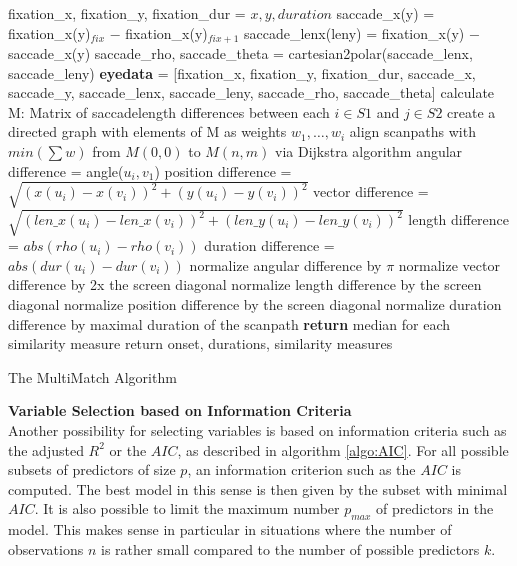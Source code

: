 \documentclass[a4paper, 11pt]{scrreprt}
\begin{document}
\begin{algorithm}
	
	{ 
		{
		fixation\_x, fixation\_y, fixation\_dur = $x, y, duration$ \;
		saccade\_x(y) = fixation\_x(y)$_{fix}$ $-$ fixation\_x(y)$_{fix+1}$ \;
		saccade\_lenx(leny) = fixation\_x(y) $-$ saccade\_x(y)\;
		saccade\_rho, saccade\_theta = cartesian2polar(saccade\_lenx, saccade\_leny) \;
		\textbf{eyedata} = [fixation\_x, fixation\_y, fixation\_dur, saccade\_x, saccade\_y, \newline saccade\_lenx, saccade\_leny, saccade\_rho, saccade\_theta]
			}
	{
		calculate M: Matrix of saccadelength differences between each $i \in S1$ and  $j \in S2$\;
		create a directed graph with elements of M as weights $w_1, \ldots, w_i$\;
		align scanpaths with $min(\sum w)$ from $M(0,0)$ to $M(n,m)$ via Dijkstra algorithm\;
	}
	{
	angular difference = angle($u_i, v_1$)\;
	position difference = $\sqrt{(x(u_i) - x(v_i))^2 + (y(u_i) - y(v_i))^2}$ \;
	vector difference = $\sqrt{(len\_x(u_i) - len\_x(v_i))^2 + (len\_y(u_i) - len\_y(v_i))^2}$\;
	length difference = $abs(rho(u_i) - rho(v_i))$\;
	duration difference = $abs(dur(u_i)-dur(v_i))$ \;
	}
	normalize angular difference by $\pi$\;
	normalize vector difference by 2x the screen diagonal\;
	normalize length difference by the screen diagonal\;
	normalize position difference by the screen diagonal\;
	normalize duration difference by maximal duration of the scanpath\;
	\textbf{return} median for each similarity measure
	}
	return onset, durations, similarity measures
	\caption{The MultiMatch Algorithm}
	\label{algo:multimatch}
\end{algorithm}



\bigskip 
\textbf{Variable Selection based on Information Criteria} \\
Another possibility for selecting variables is based on information criteria such as the adjusted $R^2$ or the $AIC$, as described in algorithm \ref{algo:AIC}.
For all possible subsets of predictors of size $p$, an information criterion such as the $AIC$ is computed. The best model in this sense is then given by the subset with minimal $AIC$. It is also possible to limit the maximum number $p_{max}$ of predictors in the model. This makes sense in particular in situations where the number of observations $n$ is rather small compared to the number of possible predictors $k$.
\end{document}
